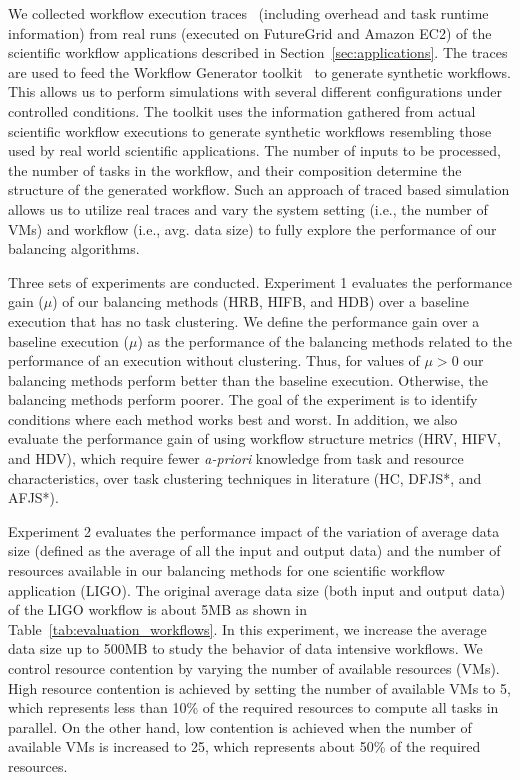 We collected workflow execution traces~\cite{Juve2013,Chen2011} (including overhead and task runtime information) from real runs (executed on FutureGrid and Amazon EC2) of the scientific workflow applications described in Section~\ref{sec:applications}. The traces are used to feed the Workflow Generator toolkit~\cite{WorkflowGenerator} to generate synthetic workflows. This allows us to perform simulations with several different configurations under controlled conditions. The toolkit uses the information gathered from actual scientific workflow executions to generate synthetic workflows resembling those used by real world scientific applications. The number of inputs to be processed, the number of tasks in the workflow, and their composition determine the structure of the generated workflow. Such an approach of traced based simulation allows us to utilize real traces and vary the system setting (i.e., the number of VMs) and workflow (i.e., avg. data size) to fully explore the performance of our balancing algorithms. 

Three sets of experiments are conducted. Experiment 1 evaluates the performance gain ($\mu$) of our balancing methods (HRB, HIFB, and HDB) over a baseline execution that has no task clustering. We define the performance gain over a baseline execution ($\mu$) as the performance of the balancing methods related to the performance of an execution without clustering. Thus, for values of $\mu > 0$ our balancing methods perform better than the baseline execution. Otherwise, the balancing methods perform poorer. The goal of the experiment is to identify conditions where each method works best and worst. In addition, we also evaluate the performance gain of using workflow structure metrics (HRV, HIFV, and HDV), which require fewer \emph{a-priori} knowledge from task and resource characteristics, over task clustering techniques in literature (HC, DFJS*, and AFJS*).

Experiment 2 evaluates the performance impact of the variation of average data size (defined as the average of all the input and output data) and the number of resources available in our balancing methods for one scientific workflow application (LIGO). The original average data size (both input and output data) of the LIGO workflow is about 5MB as shown in Table~\ref{tab:evaluation_workflows}. In this experiment, we increase the average data size up to 500MB to study the behavior of data intensive workflows. We control resource contention by varying the number of available resources (VMs). High resource contention is achieved by setting the number of available VMs to 5, which represents less than 10\% of the required resources to compute all tasks in parallel. On the other hand, low contention is achieved when the number of available VMs is increased to 25, which represents about 50\% of the required resources.

